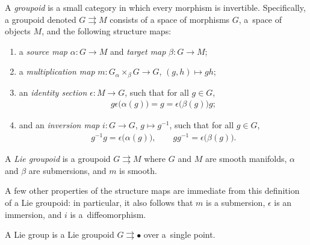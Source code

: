 \documentclass[10pt,a4paper]{amsart}
\numberwithin{equation}{section}
\begin{document}
\begin{Definition} \label{def:groupoid} A \emph{groupoid} is a small category in which every morphism is invertible. Specif\/ically, a groupoid denoted
 $ G \rightrightarrows M $ consists of a space of morphisms $G$, a~space of objects $M$, and the following structure maps:
\begin{enumerate}[label=(\roman*)]\itemsep=0pt
\item a \emph{source map} $ \alpha \colon G \rightarrow M $ and \emph{target map} $ \beta \colon G \rightarrow M $;
\item a \emph{multiplication map} $ m \colon G \mathbin{_\alpha \times _\beta } G \rightarrow G $, $ ( g, h ) \mapsto g h $;
\item an \emph{identity section} $ \epsilon \colon M \rightarrow G $, such that for all $ g \in G $,
 \begin{gather*}
 g \epsilon ( \alpha (g) \bigr) = g = \epsilon \bigl( \beta (g)\bigr) g ;
 \end{gather*}
\item and an \emph{inversion map} $ i \colon G \rightarrow G $, $ g \mapsto g ^{-1} $, such that for all $ g \in G $,
 \begin{gather*}
 g ^{-1} g = \epsilon \bigl( \alpha (g) \bigr) , \qquad g g ^{-1} = \epsilon \bigl( \beta (g) \bigr) .
 \end{gather*}
\end{enumerate}
A \emph{Lie groupoid} is a groupoid $ G \rightrightarrows M $ where $G$ and $M$ are smooth manifolds, $\alpha$ and $\beta$ are submersions, and $m$ is smooth.
\end{Definition}

\begin{Remark} A few other properties of the structure maps are immediate from this def\/inition of a Lie groupoid: in particular, it also follows that
 $m$ is a submersion, $\epsilon$ is an immersion, and $i$ is a~dif\/feomorphism.
\end{Remark}

\begin{Example} \label{ex:lieGroup} A Lie group is a Lie groupoid $ G \rightrightarrows \bullet $ over a~single point.
\end{Example}
\end{document}
